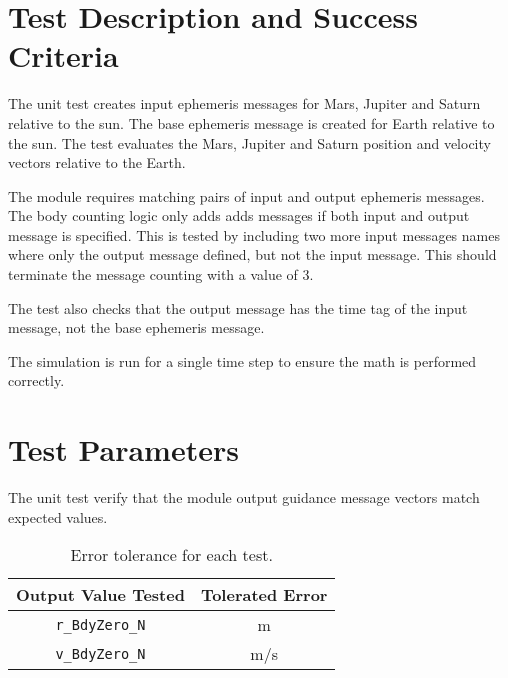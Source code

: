 
\section{Test Description and Success Criteria}
The unit test creates  input ephemeris messages for Mars, Jupiter and Saturn relative to the sun.  The base ephemeris message is created for Earth relative to the sun.  The test evaluates the Mars, Jupiter and Saturn position and velocity vectors relative to the Earth.  

The module requires matching pairs of input and output ephemeris messages.  The body counting logic only adds adds messages if both input and output message is specified.  This is tested by including two more input messages names where only the output message defined, but not the input message.  This should terminate the message counting with a value of 3.

The test also checks that the output message has the time tag of the input message, not the base ephemeris message.

The simulation is run for a single time step to ensure the math is performed correctly.  



\section{Test Parameters}

The unit test verify that the module output guidance message vectors match expected values.
\begin{table}[htbp]
	\caption{Error tolerance for each test.}
	\label{tab:errortol}
	\centering \fontsize{10}{10}\selectfont
	\begin{tabular}{ c | c } %
		\hline\hline
		\textbf{Output Value Tested}  & \textbf{Tolerated Error}  \\ 
		\hline
		{\tt r\_BdyZero\_N}        & m 	   \\ 
		{\tt v\_BdyZero\_N}        & m/s 	   \\ 
		\hline\hline
	\end{tabular}
\end{table}




